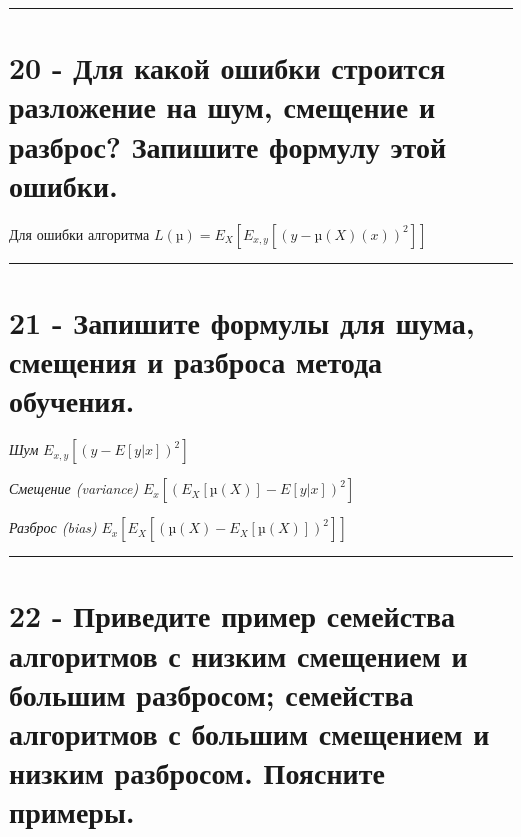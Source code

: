 \documentclass[11pt]{article}
\begin{document}
    \begin{center}\rule{0.5\linewidth}{\linethickness}\end{center}

    \section{20 - Для какой ошибки строится разложение на шум, смещение и
разброс? Запишите формулу этой
ошибки.}\label{ux434ux43bux44f-ux43aux430ux43aux43eux439-ux43eux448ux438ux431ux43aux438-ux441ux442ux440ux43eux438ux442ux441ux44f-ux440ux430ux437ux43bux43eux436ux435ux43dux438ux435-ux43dux430-ux448ux443ux43c-ux441ux43cux435ux449ux435ux43dux438ux435-ux438-ux440ux430ux437ux431ux440ux43eux441-ux437ux430ux43fux438ux448ux438ux442ux435-ux444ux43eux440ux43cux443ux43bux443-ux44dux442ux43eux439-ux43eux448ux438ux431ux43aux438.}

Для ошибки алгоритма \(L(µ) = E_X[E_{x,y}[(y − µ(X)(x))^2]]\)

    \begin{center}\rule{0.5\linewidth}{\linethickness}\end{center}

    \section{21 - Запишите формулы для шума, смещения и разброса метода
обучения.}\label{ux437ux430ux43fux438ux448ux438ux442ux435-ux444ux43eux440ux43cux443ux43bux44b-ux434ux43bux44f-ux448ux443ux43cux430-ux441ux43cux435ux449ux435ux43dux438ux44f-ux438-ux440ux430ux437ux431ux440ux43eux441ux430-ux43cux435ux442ux43eux434ux430-ux43eux431ux443ux447ux435ux43dux438ux44f.}

\emph{Шум} \(E_{x,y}[(y − E[y|x])^2]\)

\emph{Смещение (variance)} \(E_x[(E_X[µ(X)] − E[y|x])^2]\)

\emph{Разброс (bias)} \(E_x[E_X[(µ(X) − E_X[µ(X)])^2]]\)

    \begin{center}\rule{0.5\linewidth}{\linethickness}\end{center}

    \section{22 - Приведите пример семейства алгоритмов с низким смещением и
большим разбросом; семейства алгоритмов с большим смещением и низким
разбросом. Поясните
примеры.}\label{ux43fux440ux438ux432ux435ux434ux438ux442ux435-ux43fux440ux438ux43cux435ux440-ux441ux435ux43cux435ux439ux441ux442ux432ux430-ux430ux43bux433ux43eux440ux438ux442ux43cux43eux432-ux441-ux43dux438ux437ux43aux438ux43c-ux441ux43cux435ux449ux435ux43dux438ux435ux43c-ux438-ux431ux43eux43bux44cux448ux438ux43c-ux440ux430ux437ux431ux440ux43eux441ux43eux43c-ux441ux435ux43cux435ux439ux441ux442ux432ux430-ux430ux43bux433ux43eux440ux438ux442ux43cux43eux432-ux441-ux431ux43eux43bux44cux448ux438ux43c-ux441ux43cux435ux449ux435ux43dux438ux435ux43c-ux438-ux43dux438ux437ux43aux438ux43c-ux440ux430ux437ux431ux440ux43eux441ux43eux43c.-ux43fux43eux44fux441ux43dux438ux442ux435-ux43fux440ux438ux43cux435ux440ux44b.}
\end{document}
